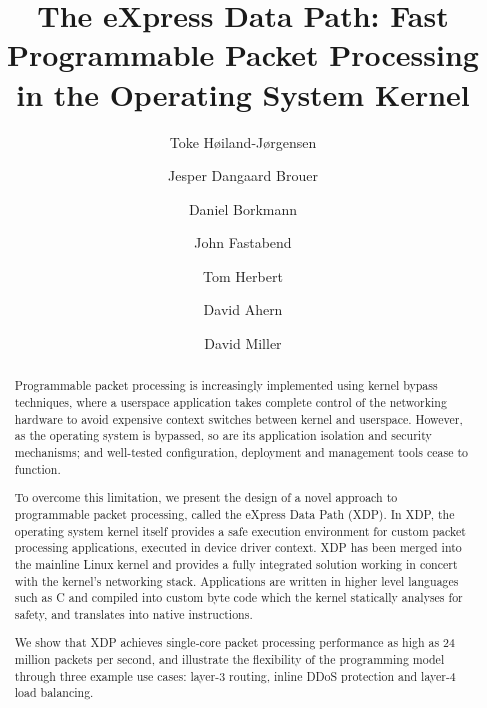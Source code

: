 \documentclass[sigconf]{acmart}
\begin{document}
\title{The eXpress Data Path: Fast Programmable Packet Processing in the Operating System Kernel}
\author{Toke Høiland-Jørgensen}

\author{Jesper Dangaard Brouer}

\author{Daniel Borkmann}

\author{John Fastabend}

\author{Tom Herbert}

\author{David Ahern}

\author{David Miller}

\renewcommand{\shortauthors}{T. Høiland-Jørgensen et al.}
\renewcommand{\shorttitle}{The eXpress Data Path}
\captionsetup{font+=small}


\begin{abstract}
  Programmable packet processing is increasingly implemented using kernel bypass
  techniques, where a userspace application takes complete control of the
  networking hardware to avoid expensive context switches between kernel and
  userspace. However, as the operating system is bypassed, so are its
  application isolation and security mechanisms; and well-tested configuration,
  deployment and management tools cease to function.

  To overcome this limitation, we present the design of a novel approach to
  programmable packet processing, called the eXpress Data Path (XDP). In XDP,
  the operating system kernel itself provides a safe execution environment for
  custom packet processing applications, executed in device driver context. XDP
  has been merged into the mainline Linux kernel and provides a fully integrated
  solution working in concert with the kernel's networking stack. Applications
  are written in higher level languages such as C and compiled into custom
  byte code which the kernel statically analyses for safety, and translates into
  native instructions.

  We show that XDP achieves single-core packet processing performance as high as
  24 million packets per second, and illustrate the flexibility of the
  programming model through three example use cases: layer-3 routing, inline
  DDoS protection and layer-4 load balancing.
\end{abstract}
\end{document}
